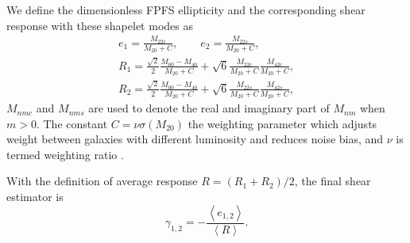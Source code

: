 We define the dimensionless FPFS ellipticity and the corresponding shear
response with these shapelet modes as
\begin{align}\label{ellipticity_define}
e_1=\frac{M_{22c}}{M_{20}+C},\qquad
e_2=\frac{M_{22s}}{M_{20}+C},\\
R_{1}=\frac{\sqrt{2}}{2}\frac{M_{00}-M_{40}}{M_{20}+C}
    +\sqrt{6}\frac{M_{22c}}{M_{20}+C}\frac{M_{42c}}{M_{20}+C},\\
R_{2}=\frac{\sqrt{2}}{2}\frac{M_{00}-M_{40}}{M_{20}+C}
    +\sqrt{6}\frac{M_{22s}}{M_{20}+C}\frac{M_{42s}}{M_{20}+C},
\end{align}
$M_{nmc}$ and $M_{nms}$ are used to denote the real and imaginary part of
$M_{nm}$ when $m>0$. The constant $C=\nu \sigma(M_{20})$ the weighting
parameter which adjusts weight between galaxies with different luminosity and
reduces noise bias, and $\nu$ is termed weighting ratio \citep{FPFS-Li2018}.

With the definition of average response $R= (R_1+R_2)/2$, the final shear
estimator is
\begin{equation}
\gamma_{1,2} =-\frac{\left\langle e_{1,2}
\right\rangle}{\left\langle R \right\rangle}.
\end{equation}

